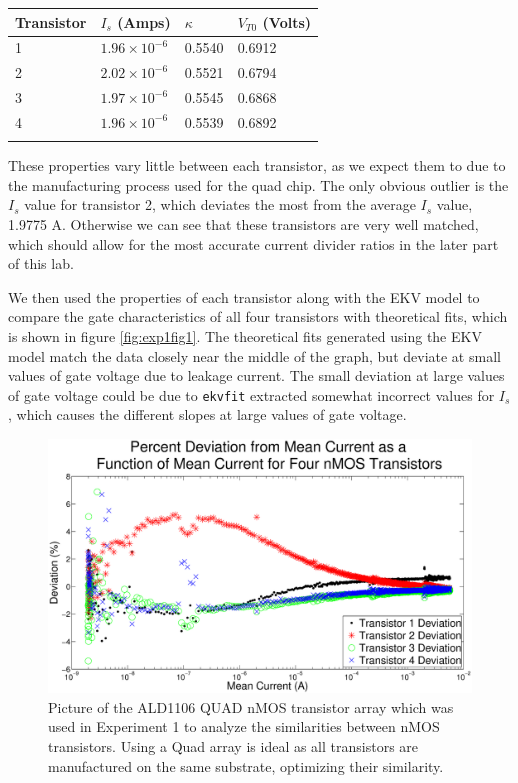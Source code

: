 \begin{table}[h]
\begin{center}
    \begin{tabular}{ l | l | l | l  }
        Transistor & $I_s$ (Amps) & $\kappa$ & $V_{T0}$ (Volts) \\
        \hline
        1 & $1.96 \times 10^{-6}$ & 0.5540  & 0.6912 \\
        2 & $2.02 \times 10^{-6}$ & 0.5521  & 0.6794 \\
        3 & $1.97 \times 10^{-6}$ & 0.5545  & 0.6868 \\
        4 & $1.96 \times 10^{-6}$ & 0.5539  & 0.6892 \\
        \label{tb:nmoschar}
    \end{tabular}
\end{center}
\end{table}

These properties vary little between each transistor, as we expect them to due to the manufacturing process used for the quad chip. The only obvious outlier is the $I_s$ value for transistor 2, which deviates the most from the average $I_s$ value, 1.9775 A. Otherwise we can see that these transistors are very well matched, which should allow for the most accurate current divider ratios in the later part of this lab.

We then used the properties of each transistor along with the EKV model to compare the gate characteristics of all four transistors with theoretical fits, which is shown in figure \ref{fig:exp1fig1}.  The theoretical fits generated using the EKV model match the data closely near the middle of the graph, but deviate at small values of gate voltage due to leakage current. The small deviation at large values of gate voltage could be due to \texttt{ekvfit} extracted somewhat incorrect values for $I_s$, which causes the different slopes at large values of gate voltage.

\begin{figure}[H]
\centering
\includegraphics[width=\linewidth]{../Figures/Experiment1Figure2.eps}
\caption{Picture of the ALD1106 QUAD nMOS transistor array which was used in Experiment 1 to analyze the similarities between nMOS transistors. Using a Quad array is ideal as all transistors are manufactured on the same substrate, optimizing their similarity.}
\label{fig:exp1fig2}
\end{figure}

